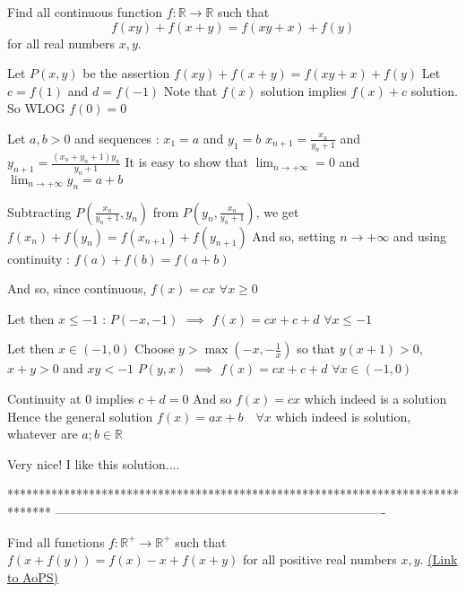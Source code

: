 \begin{solution}
	\begin{tcolorbox}Find all continuous function $f : \mathbb{R}\rightarrow\mathbb{R}$ such that 
$$f(xy)+f(x+y)=f(xy+x)+f(y)$$ for all real numbers $x,y$.\end{tcolorbox}
Let $P(x,y)$ be the assertion $f(xy)+f(x+y)=f(xy+x)+f(y)$
Let $c=f(1)$ and $d=f(-1)$
Note that $f(x)$ solution implies $f(x)+c$ solution. So WLOG $f(0)=0$

Let $a,b>0$ and sequences :
$x_1=a$ and $y_1=b$
$x_{n+1}=\frac{x_n}{y_n+1}$ and $y_{n+1}=\frac{(x_n+y_n+1)y_n}{y_n+1}$
It is easy to show that $\lim_{n\to+\infty}=0$ and $\lim_{n\to+\infty}y_n=a+b$

Subtracting $P(\frac{x_n}{y_n+1},y_n)$ from $P(y_n,\frac{x_n}{y_n+1})$, we get $f(x_n)+f(y_n)=f(x_{n+1})+f(y_{n+1})$
And so, setting $n\to+\infty$ and using continuity : $f(a)+f(b)=f(a+b)$

And so, since continuous, $f(x)=cx$ $\forall x\ge 0$

Let then $x\le -1$ : $P(-x,-1)$ $\implies$ $f(x)=cx+c+d$ $\forall x\le -1$

Let then $x\in(-1,0)$
Choose $y>\max(-x,-\frac 1x)$ so that $y(x+1)>0$, $x+y>0$ and  $xy<-1$
$P(y,x)$ $\implies$ $f(x)=cx+c+d$ $\forall x\in(-1,0)$

Continuity at $0$ implies $c+d=0$
And so $f(x)=cx$ which indeed is a solution
Hence the general solution $\boxed{f(x)=ax+b\quad\forall x}$ which indeed is solution, whatever are $a;b\in\mathbb R$








\end{solution}



\begin{solution}
	Very nice! I like this solution....
\end{solution}
*******************************************************************************
-------------------------------------------------------------------------------

\begin{problem}
	Find all functions $ f: \mathbb{R^{+}}\to \mathbb{R^{+}}$ such that $f(x+f(y))=f(x)-x+f(x+y)$ for all positive real numbers $x,y$.
	\flushright \href{https://artofproblemsolving.com/community/c6h1569200}{(Link to AoPS)}
\end{problem}



